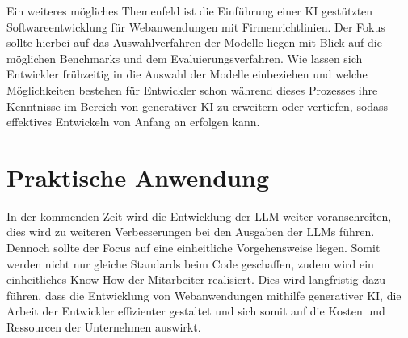Ein weiteres mögliches Themenfeld ist die Einführung einer KI gestützten Softwareentwicklung für Webanwendungen mit Firmenrichtlinien. Der Fokus sollte hierbei auf das Auswahlverfahren der Modelle liegen mit Blick auf die möglichen Benchmarks und dem Evaluierungsverfahren. Wie lassen sich Entwickler frühzeitig in die Auswahl der Modelle einbeziehen und welche Möglichkeiten bestehen für Entwickler schon während dieses Prozesses ihre Kenntnisse im Bereich von generativer KI zu erweitern oder vertiefen, sodass effektives Entwickeln von Anfang an erfolgen kann.\vspace{0.2cm}

\section{Praktische Anwendung}
In der kommenden Zeit wird die Entwicklung der LLM weiter voranschreiten, dies wird zu weiteren Verbesserungen bei den Ausgaben der LLMs führen. Dennoch sollte der Focus auf eine einheitliche Vorgehensweise liegen. Somit werden nicht nur gleiche Standards beim Code geschaffen, zudem wird ein einheitliches Know-How der Mitarbeiter realisiert. Dies wird langfristig dazu führen, dass die Entwicklung von Webanwendungen mithilfe generativer KI, die Arbeit der Entwickler effizienter gestaltet und sich somit auf die Kosten und Ressourcen der Unternehmen auswirkt.\vspace{0.2cm}

